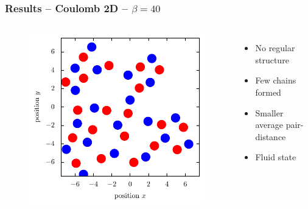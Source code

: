 \documentclass[mathserif,serif]{beamer}
\begin{document}
\begin{frame}
	\frametitle{Results -- Coulomb 2D -- $\beta=40$}
	\centering
	\begin{columns}	
	\begin{figure}
	\includegraphics[width=\textwidth]{../report/figures/Fluid_1_beta_40.pdf}
	\end{figure}
	\begin{itemize}
	\item No regular structure
	\item Few chains formed
	\item Smaller average pair-distance
	\item Fluid state
	\end{itemize}
\end{columns}
\end{frame}
\end{document}
